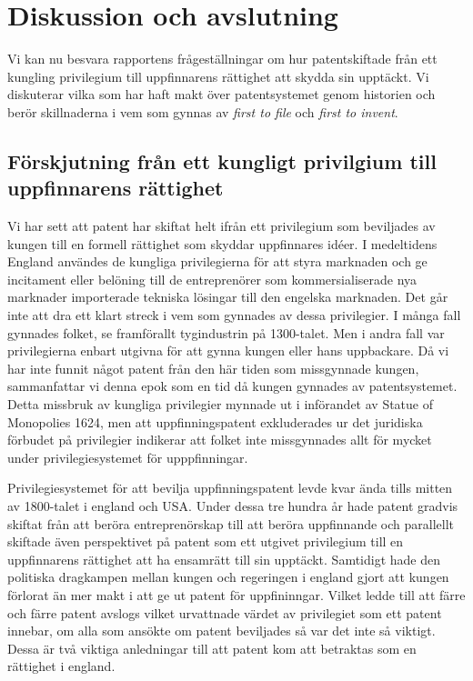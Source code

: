 \section{Diskussion och avslutning}
\label{sec:disk}



Vi kan nu besvara rapportens frågeställningar om hur patentskiftade från ett kungling privilegium till uppfinnarens rättighet att skydda sin upptäckt. Vi diskuterar vilka som har haft makt över patentsystemet genom historien och berör skillnaderna i vem som gynnas av \emph{first to file} och \emph{first to invent}.


\subsection{Förskjutning från ett kungligt privilgium till uppfinnarens rättighet}
Vi har sett att patent har skiftat helt ifrån ett privilegium som beviljades av kungen till en formell rättighet som skyddar uppfinnares idéer. I medeltidens England användes de kungliga privilegierna för att styra marknaden och ge incitament eller belöning till de entreprenörer som kommersialiserade nya marknader importerade tekniska lösingar till den engelska marknaden. Det går inte att dra ett klart streck i vem som gynnades av dessa privilegier. I många fall gynnades folket, se framförallt tygindustrin på 1300-talet. Men i andra fall var privilegierna enbart utgivna för att gynna kungen eller hans uppbackare.%
Då vi har inte funnit något patent från den här tiden som missgynnade kungen, sammanfattar vi denna epok som en tid då kungen gynnades av patentsystemet. Detta missbruk av kungliga privilegier mynnade ut i införandet av Statue of Monopolies 1624, men att uppfinningspatent exkluderades ur det juridiska förbudet på privilegier indikerar att folket inte missgynnades allt för mycket under privilegiesystemet för upppfinningar.

Privilegiesystemet för att bevilja uppfinningspatent levde kvar ända tills mitten av 1800-talet i england och USA. Under dessa tre hundra år hade patent gradvis skiftat från att beröra entreprenörskap till att beröra uppfinnande och parallellt skiftade även perspektivet på patent som ett utgivet privilegium till en uppfinnarens rättighet att ha ensamrätt till sin upptäckt. Samtidigt hade den politiska dragkampen mellan kungen och regeringen i england gjort att kungen förlorat än mer makt i att ge ut patent för uppfininngar. Vilket ledde till att färre och färre patent avslogs vilket urvattnade värdet av privilegiet som ett patent innebar, om alla som ansökte om patent beviljades så var det inte så viktigt. Dessa är två viktiga anledningar till att patent kom att betraktas som en rättighet i england.

